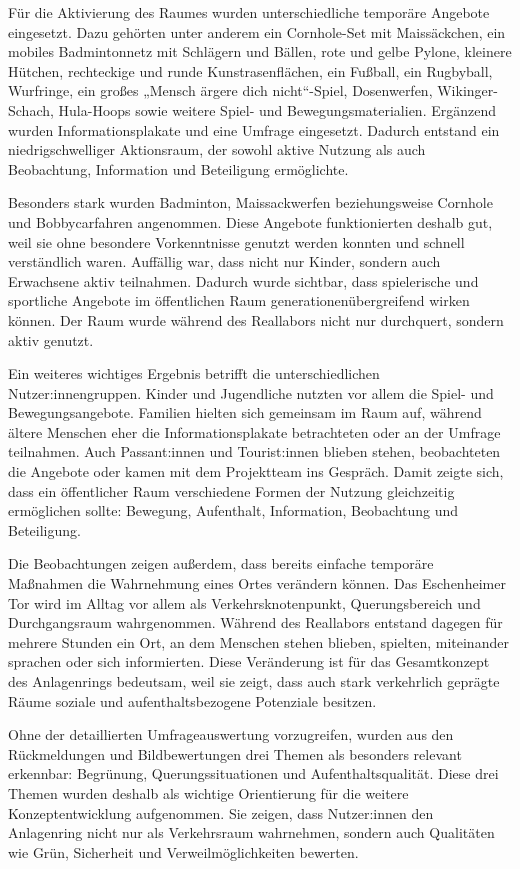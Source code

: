 \documentclass[a4paper,12pt]{article}
\begin{document}
Für die Aktivierung des Raumes wurden unterschiedliche temporäre Angebote eingesetzt. Dazu gehörten unter anderem ein Cornhole-Set mit Maissäckchen, ein mobiles Badmintonnetz mit Schlägern und Bällen, rote und gelbe Pylone, kleinere Hütchen, rechteckige und runde Kunstrasenflächen, ein Fußball, ein Rugbyball, Wurfringe, ein großes „Mensch ärgere dich nicht“-Spiel, Dosenwerfen, Wikinger-Schach, Hula-Hoops sowie weitere Spiel- und Bewegungsmaterialien. Ergänzend wurden Informationsplakate und eine Umfrage eingesetzt. Dadurch entstand ein niedrigschwelliger Aktionsraum, der sowohl aktive Nutzung als auch Beobachtung, Information und Beteiligung ermöglichte.

Besonders stark wurden Badminton, Maissackwerfen beziehungsweise Cornhole und Bobbycarfahren angenommen. Diese Angebote funktionierten deshalb gut, weil sie ohne besondere Vorkenntnisse genutzt werden konnten und schnell verständlich waren. Auffällig war, dass nicht nur Kinder, sondern auch Erwachsene aktiv teilnahmen. Dadurch wurde sichtbar, dass spielerische und sportliche Angebote im öffentlichen Raum generationenübergreifend wirken können. Der Raum wurde während des Reallabors nicht nur durchquert, sondern aktiv genutzt.

Ein weiteres wichtiges Ergebnis betrifft die unterschiedlichen Nutzer:innengruppen. Kinder und Jugendliche nutzten vor allem die Spiel- und Bewegungsangebote. Familien hielten sich gemeinsam im Raum auf, während ältere Menschen eher die Informationsplakate betrachteten oder an der Umfrage teilnahmen. Auch Passant:innen und Tourist:innen blieben stehen, beobachteten die Angebote oder kamen mit dem Projektteam ins Gespräch. Damit zeigte sich, dass ein öffentlicher Raum verschiedene Formen der Nutzung gleichzeitig ermöglichen sollte: Bewegung, Aufenthalt, Information, Beobachtung und Beteiligung.

Die Beobachtungen zeigen außerdem, dass bereits einfache temporäre Maßnahmen die Wahrnehmung eines Ortes verändern können. Das Eschenheimer Tor wird im Alltag vor allem als Verkehrsknotenpunkt, Querungsbereich und Durchgangsraum wahrgenommen. Während des Reallabors entstand dagegen für mehrere Stunden ein Ort, an dem Menschen stehen blieben, spielten, miteinander sprachen oder sich informierten. Diese Veränderung ist für das Gesamtkonzept des Anlagenrings bedeutsam, weil sie zeigt, dass auch stark verkehrlich geprägte Räume soziale und aufenthaltsbezogene Potenziale besitzen.

Ohne der detaillierten Umfrageauswertung vorzugreifen, wurden aus den Rückmeldungen und Bildbewertungen drei Themen als besonders relevant erkennbar: Begrünung, Querungssituationen und Aufenthaltsqualität. Diese drei Themen wurden deshalb als wichtige Orientierung für die weitere Konzeptentwicklung aufgenommen. Sie zeigen, dass Nutzer:innen den Anlagenring nicht nur als Verkehrsraum wahrnehmen, sondern auch Qualitäten wie Grün, Sicherheit und Verweilmöglichkeiten bewerten.
\end{document}
